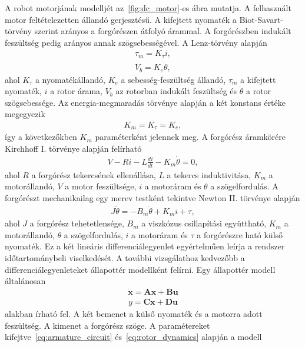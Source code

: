 A robot motorjának modelljét az~\ref{fig:dc_motor}-es ábra mutatja. A felhasznált motor feltételezetten állandó gerjesztésű. A kifejtett nyomaték 
a Biot-Savart-törvény szerint arányos a forgórészen átfolyó árammal. A forgórészben
indukált feszültség pedig arányos annak szögsebességével. A Lenz-törvény alapján 
\begin{align}
    \tau_m = K_\tau i, \\
    V_b = K_e \dot\theta,
\end{align}
ahol $K_\tau$ a nyomatékállandó, $K_e$ a sebesség-feszültség állandó, $\tau_m$ a kifejtett 
nyomaték, $i$ a rotor árama, $V_b$ az rotorban indukált feszültség és $\dot\theta$ a rotor szögsebessége.
Az energia-megmaradás törvénye alapján a két konstans értéke megegyezik
\begin{align}
    K_m = K_\tau = K_e,
\end{align}
így a következőkben $K_m$ paraméterként jelennek meg. A forgórész áramkörére Kirchhoff I. törvénye alapján felírható
\begin{align}\label{eq:armature_circuit}
    V - Ri - L\frac{di}{dt} - K_m\dot\theta = 0,
\end{align}
ahol $R$ a forgórész tekercsének ellenállása, $L$ a tekercs induktivitása, 
$K_m$ a motorállandó, $V$ a motor feszültsége, $i$ a motoráram és $\theta$ a szögelfordulás.
A forgórészt mechanikailag egy merev testként tekintve Newton II. törvénye alapján
\begin{align}\label{eq:rotor_dynamics}
    J\ddot\theta = -B_m\dot\theta + K_m i + \tau,
\end{align}
ahol $J$ a forgórész tehetetlensége, $B_m$ a viszkózus csillapítási együttható, 
$K_m$ a motorállandó, $\theta$ a szögelfordulás, $i$ a motoráram és $\tau$ a forgórészre
ható külső nyomaték. Ez a két lineáris differenciálegyenlet egyértelműen leírja a 
rendszer időtartománybeli viselkedését.
A további vizsgálathoz kedvezőbb a differenciálegyenleteket állapottér modellként felírni.
Egy állapottér modell általánosan
\begin{align}\label{eq:state_space_generic}
    \dot{\bm x} = \bm A \bm x + \bm B \bm u
\end{align}
\begin{align}\label{eq:state_space_generic_out}
    y = \bm C \bm x + \bm D \bm u
\end{align} 
alakban írható fel. 
A két bemenet a külső nyomaték és a motorra adott feszültség. A kimenet a forgórész szöge.
A paramétereket kifejtve~\eqref{eq:armature_circuit} és~\eqref{eq:rotor_dynamics} alapján a modell

